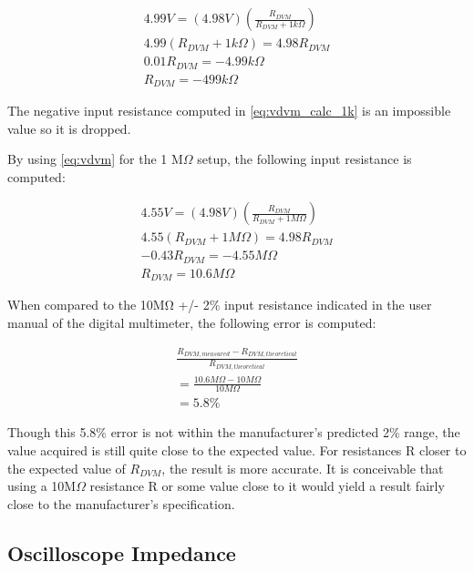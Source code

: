 \documentclass[a4paper,titlepage,10pt]{article}
\begin{document}
\begin{equation}
\label{eq:vdvm_calc_1k}
\begin{gathered}
4.99 V = (4.98 V)(\frac{R_{DVM}}{R_{DVM} + 1 k\Omega})\\
4.99(R_{DVM} + 1 k\Omega) = 4.98 R_{DVM}\\
0.01 R_{DVM} = -4.99 k\Omega\\
R_{DVM} = -499 k\Omega
\end{gathered}
\end{equation}

The negative input resistance computed in \ref{eq:vdvm_calc_1k} is an impossible value so it is dropped.

By using \ref{eq:vdvm} for the 1 M$\Omega$ setup, the following input resistance is computed:

\begin{equation}
	\label{eq:vdvm_calc_1M}
	\begin{gathered}
		4.55 V = (4.98 V)(\frac{R_{DVM}}{R_{DVM} + 1 M\Omega})\\
		4.55(R_{DVM} + 1 M\Omega) = 4.98 R_{DVM}\\
		-0.43 R_{DVM} = -4.55 M\Omega\\
		R_{DVM} = 10.6 M\Omega
	\end{gathered}
\end{equation}
	
When compared to the 10M\si{\ohm} +/- 2\% input resistance indicated in the user manual of the digital multimeter, the following error is computed:

\begin{equation}
	\label{eq:vdvm_error}
	\begin{gathered}
		\frac{R_{DVM, measured} - R_{DVM, theoretical}}{R_{DVM, theoretical}}\\
	= \frac{10.6 M\Omega - 10 M\Omega}{10 M\Omega}\\
	= 5.8\%
	\end{gathered}
\end{equation}

Though this 5.8\% error is not within the manufacturer's predicted 2\% range, the value acquired is still quite close to the expected value. For resistances R closer to the expected value of $R_{DVM}$, the result is more accurate. It is conceivable that using a 10M$\Omega$ resistance R or some value close to it would yield a result fairly close to the manufacturer's specification.

\subsection{Oscilloscope Impedance}

\end{document}
